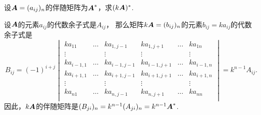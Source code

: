 \begin{example}
设\(\boldsymbol{A}=(a_{ij})_n\)的伴随矩阵为\(\boldsymbol{A}^*\)，求\((k\boldsymbol{A})^*\).
\begin{solution}
设\(\boldsymbol{A}\)的元素\(a_{ij}\)的代数余子式是\(A_{ij}\)，
那么矩阵\(k\boldsymbol{A} = (b_{ij})_n\)的元素\(b_{ij} = k a_{ij}\)的代数余子式是\[
	B_{ij}
	= (-1)^{i+j}
	\begin{vmatrix}
		k a_{11} & \dots & k a_{1,j-1} & k a_{1,j+1} & \dots & k a_{1n} \\
		\vdots & & \vdots & \vdots & & \vdots \\
		k a_{i-1,1} & \dots & k a_{i-1,j-1} & k a_{i-1,j+1} & \dots & k a_{i-1,n} \\
		k a_{i+1,1} & \dots & k a_{i+1,j-1} & k a_{i+1,j+1} & \dots & k a_{i+1,n} \\
		\vdots & & \vdots & \vdots & & \vdots \\
		k a_{n1} & \dots & k a_{n,j-1} & k a_{n,j+1} & \dots & k a_{nn} \\
	\end{vmatrix}
	= k^{n-1} A_{ij}.
\]
因此，\(k\boldsymbol{A}\)的伴随矩阵是\((B_{ji})_n
= k^{n-1} (A_{ji})_n
= k^{n-1} \boldsymbol{A}^*\).
\end{solution}
\end{example}


